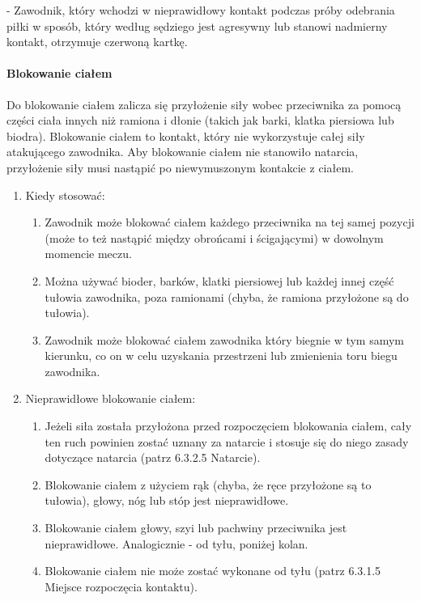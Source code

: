\documentclass[12pt]{article}
\newcommand\redcard{\bgroup\color{red}\markoverwith{\textcolor{red}{\rule[-0.5ex]{2pt}{0.4pt}}}\ULon}
\begin{document}
\redcard{Czerwona kartka} - Zawodnik, który wchodzi w nieprawidłowy kontakt
podczas próby odebrania piłki w sposób, który według sędziego jest
agresywny lub stanowi nadmierny kontakt, otrzymuje czerwoną kartkę.

\paragraph{Blokowanie ciałem}
Do blokowanie ciałem zalicza się
przyłożenie siły wobec przeciwnika za pomocą części ciała innych niż
ramiona i dłonie (takich jak barki, klatka piersiowa lub biodra).
Blokowanie ciałem to kontakt, który nie wykorzystuje całej siły
atakującego zawodnika. Aby blokowanie ciałem nie stanowiło natarcia,
przyłożenie siły musi nastąpić po niewymuszonym kontakcie z ciałem.

\begin{enumerate}
	\item
	      Kiedy stosować:

	      \begin{enumerate}
		      \item
		            Zawodnik może blokować ciałem każdego przeciwnika na tej samej
		            pozycji (może to też nastąpić między obrońcami i ścigającymi) w
		            dowolnym momencie meczu.
		      \item
		            Można używać bioder, barków, klatki piersiowej lub każdej innej
		            część tułowia zawodnika, poza ramionami (chyba, że ramiona
		            przyłożone są do tułowia).
		      \item
		            Zawodnik może blokować ciałem zawodnika który biegnie w tym samym
		            kierunku, co on w celu uzyskania przestrzeni lub zmienienia toru
		            biegu zawodnika.
	      \end{enumerate}
	\item
	      Nieprawidłowe blokowanie ciałem:

	      \begin{enumerate}
		      \item
		            Jeżeli siła została przyłożona przed rozpoczęciem blokowania ciałem,
		            cały ten ruch powinien zostać uznany za natarcie i stosuje się do
		            niego zasady dotyczące natarcia (patrz 6.3.2.5 Natarcie).
		      \item
		            Blokowanie ciałem z użyciem rąk (chyba, że ręce przyłożone są to
		            tułowia), głowy, nóg lub stóp jest nieprawidłowe.
		      \item
		            Blokowanie ciałem głowy, szyi lub pachwiny przeciwnika jest
		            nieprawidłowe. Analogicznie - od tyłu, poniżej kolan.
		      \item
		            Blokowanie ciałem nie może zostać wykonane od tyłu (patrz 6.3.1.5
		            Miejsce rozpoczęcia kontaktu).
	      \end{enumerate}
\end{enumerate}
\end{document}
